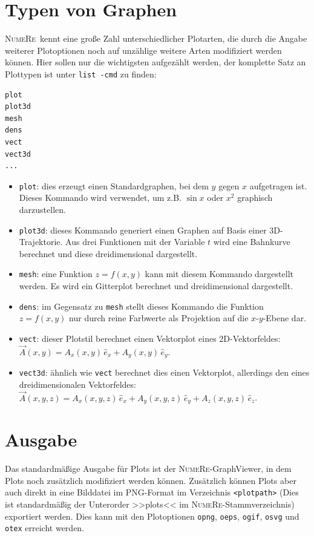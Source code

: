 \documentclass[DIV=14,headsepline,footsepline]{scrbook}
\newcommand{\NR}{\textsc{Nu\-me\-Re}}
\begin{document}
			\section{Typen von Graphen}
				\NR\ kennt eine große Zahl unterschiedlicher Plotarten, die durch die Angabe weiterer Plotoptionen noch auf unzählige weitere Arten modifiziert werden können. Hier sollen nur die wichtigsten aufgezählt werden, der komplette Satz an Plottypen ist unter \verb+list -cmd+ zu finden:
				\begin{lstlisting}
plot
plot3d
mesh
dens
vect
vect3d
...
				\end{lstlisting}
				\begin{itemize}
					\item \verb+plot+: dies erzeugt einen Standardgraphen, bei dem $y$ gegen $x$ aufgetragen ist. Dieses Kommando wird verwendet, um z.B. $\sin x$ oder $x^2$ graphisch darzustellen.
					\item \verb+plot3d+: dieses Kommando generiert einen Graphen auf Basis einer 3D-Trajektorie. Aus drei Funktionen mit der Variable $t$ wird eine Bahnkurve berechnet und diese dreidimensional dargestellt.
					\item \verb+mesh+: eine Funktion $z = f(x,y)$ kann mit diesem Kommando dargestellt werden. Es wird ein Gitterplot berechnet und dreidimensional dargestellt.
					\item \verb+dens+: im Gegensatz zu \verb+mesh+ stellt dieses Kommando die Funktion $z = f(x,y)$ nur durch reine Farbwerte als Projektion auf die $x$-$y$-Ebene dar.
					\item \verb+vect+: dieser Plotstil berechnet einen Vektorplot eines 2D-Vektorfeldes: $\vec A(x,y) = A_x(x,y)\,\hat e_x + A_y(x,y)\,\hat e_y$.
					\item \verb+vect3d+: ähnlich wie \verb+vect+ berechnet dies einen Vektorplot, allerdings den eines dreidimensionalen Vektorfeldes: $\vec A(x,y,z) = A_x(x,y,z)\,\hat e_x + A_y(x,y,z)\,\hat e_y + A_z(x,y,z)\,\hat e_z$.
				\end{itemize}
			\section{Ausgabe}
				Das standardmäßige Ausgabe für Plots ist der \NR-GraphViewer, in dem Plots noch zusätzlich modifiziert werden können. Zusätzlich können Plots aber auch direkt in eine Bilddatei im PNG-Format im Verzeichnis \verb+<plotpath>+ (Dies ist standardmäßig der Unterorder >>plots<< im \NR-Stammverzeichnis) exportiert werden. Dies kann mit den Plotoptionen \verb+opng+, \verb+oeps+, \verb+ogif+, \verb+osvg+ und \verb+otex+ erreicht werden.
				
\end{document}
